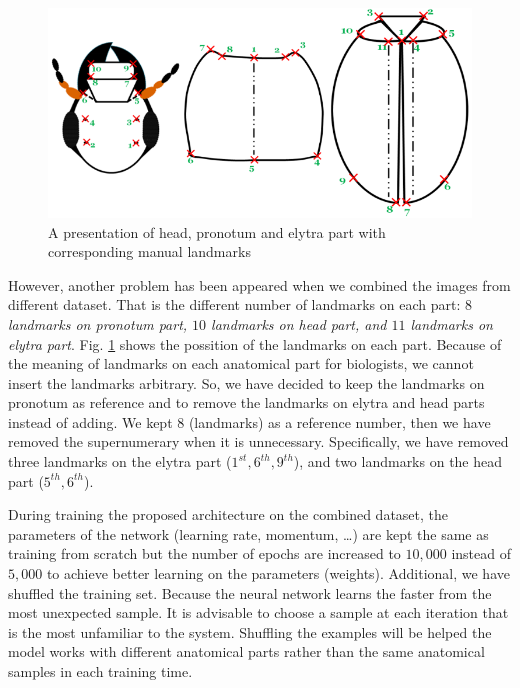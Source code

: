 \documentclass[review]{elsarticle}
\begin{document}
\begin{figure}[htbp]
	\centerline{\includegraphics[scale=0.5]{images/merge}}
	\caption{A presentation of head, pronotum and elytra part with
corresponding manual landmarks}
	\label{figmerge}
\end{figure}

However, another problem has been appeared when we combined the images from different dataset. That is the different number of landmarks on each part: \textit{$8$ landmarks on pronotum part, $10$ landmarks on head part, and $11$ landmarks on elytra part}. Fig. \ref{figmerge} shows the possition of the landmarks on each part. Because of the meaning of landmarks on each anatomical part for biologists, we cannot insert the landmarks arbitrary. So,  we have decided to keep the landmarks on pronotum as reference and to remove the landmarks on elytra and head parts instead of adding. We kept $8$ (landmarks) as a reference number, then we have removed the supernumerary when it is unnecessary. Specifically, we have removed three landmarks on the elytra part ($1^{st}, 6^{th}, 9^{th}$), and two landmarks on the head part ($5^{th}, 6^{th}$). 

During training the proposed architecture on the combined dataset, the parameters of the network (learning rate, momentum, \ldots) are kept the same as training from scratch but the number of epochs are increased to $10, 000$ instead of $5, 000$ to achieve better learning on the parameters (weights). Additional, we have shuffled the training set. Because the neural network learns the faster from the most unexpected sample. It is advisable to choose a sample at each iteration that is the most unfamiliar to the system. Shuffling the examples will be helped the model works with different anatomical parts rather than the same anatomical samples in each training time.
\end{document}
